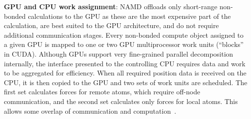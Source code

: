 \textbf{GPU and CPU work assignment}:
NAMD offloads only short-range non-bonded calculations to the GPU
as these are the most expensive part of the calculation, are best suited
to the GPU architecture, and do not require additional communication stages.
Every non-bonded compute object assigned to a given GPU is mapped to one or
two GPU multiprocessor work units (``blocks'' in CUDA).
Although GPUs support very fine-grained parallel decomposition internally,
the interface presented to the controlling CPU requires data and work to
be aggregated for efficiency.
When all required position data is received on the CPU, it is then copied
to the GPU and two sets of work units are scheduled.
The first set calculates forces for remote atoms, which require off-node
communication, and the second set calculates only forces for local atoms.
This allows some overlap of communication and computation~\cite{phillips_stone_namd_cuda}.



